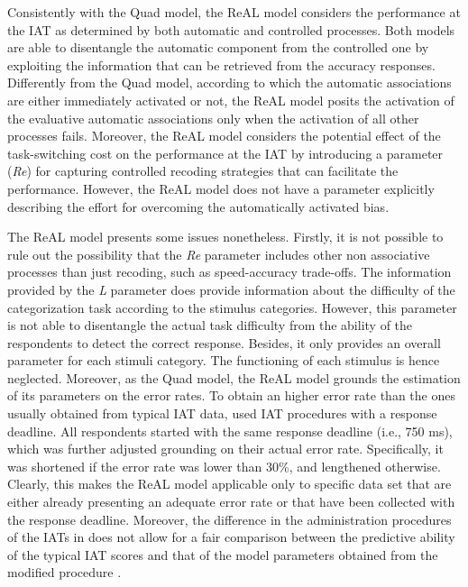 \documentclass[12pt]{book}
\begin{document}
Consistently with the Quad model, the ReAL model considers the performance at the IAT as determined by both automatic and controlled processes. 
Both models are able to disentangle the automatic component from the controlled one by exploiting the information that can be retrieved from the accuracy responses. 
Differently from the Quad model, according to which the automatic associations are either immediately activated or not, the ReAL model posits the activation of the evaluative automatic associations only when the activation of all other processes fails. 
Moreover, the ReAL model considers the potential effect of the task-switching cost on the performance at the IAT by introducing a parameter (\emph{Re}) for capturing controlled recoding strategies that can facilitate the performance. 
However, the ReAL model does not have a parameter explicitly describing the effort for overcoming the automatically activated bias.

The ReAL model presents some issues nonetheless. 
Firstly, it is not possible to rule out the possibility that the \emph{Re} parameter  includes other non associative processes than just recoding, such as speed-accuracy trade-offs. 
The information provided by the \emph{L} parameter does provide information about the difficulty of the categorization task according to the stimulus categories. 
However, this parameter is not able to disentangle the actual task difficulty from the ability of the respondents to detect the correct response. Besides, it only provides an overall parameter for each stimuli category. The functioning of each stimulus is hence neglected.
Moreover, as the Quad model, the ReAL model grounds the estimation of its parameters on the error rates. To obtain an higher error rate than the ones usually obtained from typical IAT data,  used IAT procedures with a response deadline. All respondents started with the same response deadline (i.e., 750 ms), which was further adjusted grounding on their actual error rate. 
Specifically, it was shortened if the error rate was lower than 30\%, and lengthened otherwise. 
Clearly, this makes the ReAL model applicable only to specific data set that are either already presenting an adequate error rate or that have been collected with the response deadline. Moreover, the difference in the administration procedures of the IATs in  does not allow for a fair comparison between the predictive ability of the typical IAT scores and that of the model parameters obtained from the modified procedure \cite<see Discussion of Study 7 in >[for further details]{Meissner2013}. 
\end{document}
